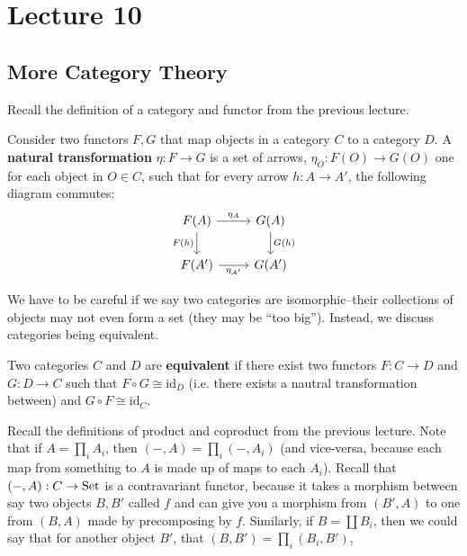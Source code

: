 \section{Lecture 10}
\subsection{More Category Theory}
Recall the definition of a category and functor from the previous lecture.
\begin{definition}
    Consider two functors $F, G$ that map
    objects in a category $C$ to a category $D$.
    A \textbf{natural transformation} $\eta: F \to G$ is a set of arrows, $\eta_O: F(O) \to G(O)$
    one for each object in $O\in C$, such that for every arrow $h: A \to A'$, the following diagram commutes:
    \[\begin{tikzcd}
        {F(A)} & {G(A)} \\
        {F(A')} & {G(A')}
        \arrow["{F(h)}"', from=1-1, to=2-1]
        \arrow["{\eta_A}", from=1-1, to=1-2]
        \arrow["{\eta_{A'}}"', from=2-1, to=2-2]
        \arrow["{G(h)}", from=1-2, to=2-2]
    \end{tikzcd}\]
\end{definition}
We have to be careful if we say two categories are isomorphic--their collections of objects may not even form a set (they may be ``too big'').
Instead, we discuss categories being equivalent.
\begin{definition}
    Two categories $C$ and $D$ are \textbf{equivalent} if there exist two functors $F: C \to D$ and $G: D \to C$
    such that $F \circ G \cong \textrm{id}_{D}$ (i.e. there exists a nautral transformation between)
    and $G \circ F \cong \textrm{id}_{C}$.
\end{definition}
Recall the definitions of product and coproduct from the previous lecture. Note that
if $A = \prod_i A_i$, then $(-, A) = \prod_i (-, A_i)$ (and vice-versa, because each map from something to $A$
is made up of maps to each $A_i$). Recall that $(-,A): C \to \operatorname{Set}$ is a contravariant functor, because it takes a morphism
between say two objects $B, B'$ called $f$ and can give you a morphism from $(B', A)$ to one from $(B, A)$ made by
precomposing by $f$. Similarly,
if $B = \coprod B_i$, then we could say that for another object $B'$, that $(B, B') = \prod_i (B_i, B')$,
